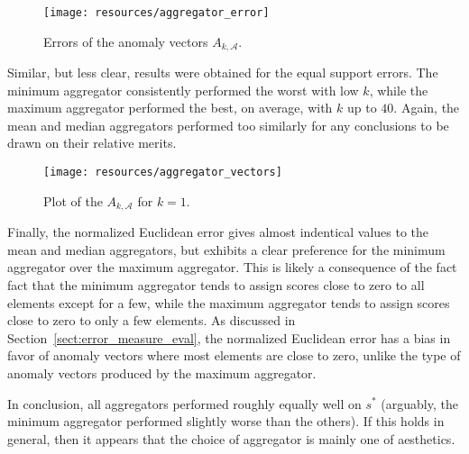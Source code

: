 \begin{figure}[!ht]
    \vspace{-5pt}
    \begin{center}
        \texttt{[image: resources/aggregator\_error]}
    \end{center}
    \vspace{-18pt}
    \caption{\small{Errors of the anomaly vectors $A_{k, \mathcal{A}}$.}}
\label{fig:aggregator_error}
    \vspace{-10pt}
\end{figure}

Similar, but less clear, results were obtained for the equal support errors. The minimum aggregator consistently performed the worst with low $k$, while the maximum aggregator performed the best, on average, with $k$ up to $40$. Again, the mean and median aggregators performed too similarly for any conclusions to be drawn on their relative merits.

\begin{wrapfigure}{r}{0.49\textwidth}
    \vspace{-20pt}
    \begin{center}
        \texttt{[image: resources/aggregator\_vectors]}
    \end{center}
    \vspace{-20pt}
    \caption{\small{Plot of the $A_{k, \mathcal{A}}$ for $k=1$.}}
    \vspace{-0pt}
\label{fig:aggregator_vectors}
\end{wrapfigure}

Finally, the normalized Euclidean error gives almost indentical values to the mean and median aggregators, but exhibits a clear preference for the minimum aggregator over the maximum aggregator. This is likely a consequence of the fact fact that the minimum aggregator tends to assign scores close to zero to all elements except for a few, while the maximum aggregator tends to assign scores close to zero to only a few elements. As discussed in Section~\ref{sect:error_measure_eval}, the normalized Euclidean error has a bias in favor of anomaly vectors where most elements are close to zero, unlike the type of anomaly vectors produced by the maximum aggregator.

In conclusion, all aggregators performed roughly equally well on $s^*$ (arguably, the minimum aggregator performed slightly worse than the others). If this holds in general, then it appears that the choice of aggregator is mainly one of aesthetics.
